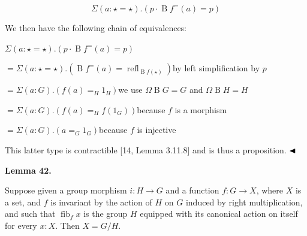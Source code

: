 \documentclass[10pt,a4paper]{article}
\begin{document}
\par  \quad  \[\Sigma(a:\star=\star).(p\cdot\operatorname{B}f^{=}(a)=p)\]\quad  \quad  
  
We then have the following chain of equivalences:\par
  
\par  \quad  $\displaystyle\Sigma(a:\star=\star).$\quad  $\displaystyle(p\cdot\operatorname{B}f^{=}(a)=p)$\quad  \quad  
 
\par  \quad  \quad  $\displaystyle=\Sigma(a:\star=\star).(\operatorname{B}f^{=}(a)=\operatorname{refl}_{\operatorname{B}f(\star)})$\quad  by left simplification by $p$\quad  \quad  
 
\par  \quad  \quad  $\displaystyle=\Sigma(a:G).(f(a)=_{H}1_{H})$\quad  we use $\Omega\operatorname{B}G=G$ and $\Omega\operatorname{B}H=H$\quad  \quad  
 
\par  \quad  \quad  $\displaystyle=\Sigma(a:G).(f(a)=_{H}f(1_{G}))$\quad  because $f$ is a morphism\quad  \quad  
 
\par  \quad  \quad  $\displaystyle=\Sigma(a:G).(a=_{G}1_{G})$\quad  because $f$ is injective\quad  \quad  
  
This latter type is contractible [14, Lemma 3.11.8] and is thus a proposition. $\hfill\blacktriangleleft$\par
 
 
 
\par\medskip\noindent\textbf{Lemma 42.}\par
 
 
Suppose given a group morphism $i:H\to G$ and a function $f:G\to X$, where $X$ is a set, and $f$ is invariant by the action of $H$ on $G$ induced by right multiplication, and such that $\operatorname{fib}_{f}x$ is the group $H$ equipped with its canonical action on itself for every $x:X$. Then $X=G/H$.\par
 
 
 
 
 
\end{document}
